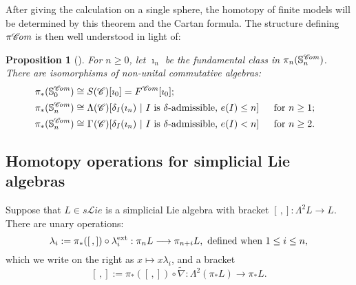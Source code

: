 \documentclass[11pt]{amsart} \renewcommand{\baselinestretch}{1.2}
\theoremstyle{plain}
\newtheorem{prop}[thm]{Proposition}
\numberwithin{equation}{section} %
\theoremstyle{plain}
\newtheorem{prop}[thm]{Proposition}
\numberwithin{equation}{chapter} %
\renewcommand{\to}{\longrightarrow}
\newcommand{\scrL}{\mathscr{L}}
\newcommand{\scrC}{\mathscr{C}}
\newcommand{\CommOperad}{{\scrC}}
\newcommand{\PA}[1]{\pi#1}
\newcommand{\algs}{{\scrC\!\textit{\normalfont\textit{om}}}}
\newcommand{\liealgs}{{\scrL\!\textit{ie}}}
\renewcommand{\mapsto}{\longmapsto}
\newcommand{\SubsectionOrSection}[1]{\subsection{#1}}
\begin{document}
\begin{Constructing homotopy operations}
\noindent After giving the calculation on a single sphere, the homotopy of finite models will be determined by this theorem and the Cartan formula. The structure defining $\PA{\algs}$ is then well understood in light of:
\begin{prop}[{\cite[Proposition 2.7]{MR1089001}}]
\label{homotopy of comm alg sphere}
\noindent For $n\geq0$, let $\imath_n$ be the fundamental class in $\pi_n(\mathbb{S}^\algs_n)$. There  are isomorphisms of non-unital commutative algebras:
\begin{alignat*}{2}
\pi_*(\mathbb{S}^\algs_0)
&\cong
S(\CommOperad)[\imath_0]=F^{\algs}[\imath_0];%
\\
\pi_*(\mathbb{S}^\algs_n)
&\cong
\makebox[\widthof{$\Lambda$}][c]{$\Lambda$}(\CommOperad)[\delta_I(\imath_n)\ |\ \textup{$I$ is $\delta$-admissible, $e(I)\leq n$}]%
&\ \ &\makebox[\widthof{for $n\geq1$}][c]{for $n\geq1$;}\\
\pi_*(\mathbb{S}^\algs_n)
&\cong
\makebox[\widthof{$\Lambda$}][c]{$\Gamma$}(\CommOperad)[\delta_I(\imath_n)\ |\ \textup{$I$ is $\delta$-admissible, $e(I)< n$}]%
&\ \ &\makebox[\widthof{for $n\geq1$}][c]{for $n\geq2$.}%
\end{alignat*}
\end{prop}

\SubsectionOrSection{Homotopy operations for simplicial Lie algebras}\label{Homotopy operations for simplicial Lie algebras}
Suppose that $L\in s \liealgs$ is a simplicial Lie algebra with bracket $[\,,]:\Lambda^2L\to L$. There are unary operations:
\[\lambda_i:=\pi_*([\,,])\circ\lambda_i^\textup{ext}:\pi_nL\to \pi_{n+i}L,\textup{ defined when }1\leq i\leq n,\]
which we write on the right as $x\mapsto x\lambda_i$, and a bracket
\[[\,,]:=\pi_*([\,,])\circ\widetilde{\nabla}:\Lambda^2(\pi_*L)\to \pi_{*}L.\]


\end{Constructing homotopy operations}
\end{document}
